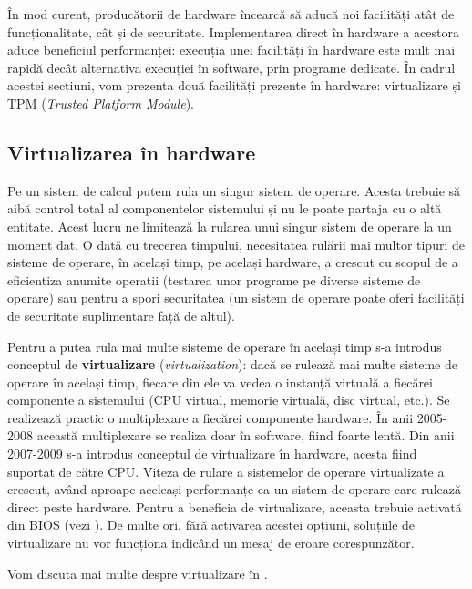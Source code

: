 În mod curent, producătorii de hardware încearcă să aducă noi facilități atât de
funcționalitate, cât și de securitate. Implementarea direct în hardware a
acestora aduce beneficiul performanței: execuția unei facilități în hardware
este mult mai rapidă decât alternativa execuției în software, prin programe
dedicate. În cadrul acestei secțiuni, vom prezenta două facilități prezente în
hardware: virtualizare și TPM 
(\textit{Trusted Platform Module}).

\subsection{Virtualizarea în hardware}
\label{sec:hw:features:virt}

Pe un sistem de calcul putem rula un singur sistem de operare. Acesta trebuie să
aibă control total al componentelor sistemului și nu le poate partaja cu o altă
entitate. Acest lucru ne limitează la rularea unui singur sistem de operare la
un moment dat. O dată cu trecerea timpului, necesitatea rulării mai multor
tipuri de sisteme de operare, în același timp, pe același hardware, a crescut cu
scopul de a eficientiza anumite operații (testarea unor programe pe diverse
sisteme de operare) sau pentru a spori securitatea (un sistem de operare poate
oferi facilități de securitate suplimentare față de altul).

Pentru a putea rula
mai multe sisteme de operare în același timp s-a introdus conceptul de
\textbf{virtualizare} (\textit{virtualization}): dacă se rulează mai multe sisteme de
operare în același timp, fiecare din ele va vedea o instanță virtuală a fiecărei
componente a sistemului (CPU virtual, memorie virtuală, disc virtual, etc.). Se
realizează practic o multiplexare a fiecărei componente hardware. În anii
2005-2008 această multiplexare se realiza doar în software, fiind foarte lentă.
Din anii 2007-2009 s-a introdus conceptul de virtualizare în hardware, acesta
fiind suportat de către CPU. Viteza de rulare a sistemelor de operare
virtualizate a crescut, având aproape aceleași performanțe ca un sistem de
operare care rulează direct peste hardware. Pentru a beneficia de virtualizare,
aceasta trebuie activată din BIOS (vezi ).
De multe ori, fără activarea acestei opțiuni, soluțiile de virtualizare nu vor
funcționa indicând un mesaj de eroare corespunzător.

Vom discuta mai multe despre virtualizare în .

